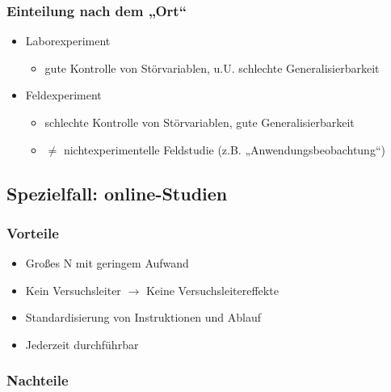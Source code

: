 \documentclass[
]{book}
\providecommand{\tightlist}{%
  \setlength{\itemsep}{0pt}\setlength{\parskip}{0pt}}
\begin{document}
\hypertarget{einteilung-nach-dem-ort}{%
\subsubsection{Einteilung nach dem „Ort``}\label{einteilung-nach-dem-ort}}

\begin{itemize}
\tightlist
\item
  Laborexperiment

  \begin{itemize}
  \tightlist
  \item
    gute Kontrolle von Störvariablen, u.U. schlechte Generalisierbarkeit
  \end{itemize}
\item
  Feldexperiment

  \begin{itemize}
  \tightlist
  \item
    schlechte Kontrolle von Störvariablen, gute Generalisierbarkeit
  \item
    \(\neq\) nichtexperimentelle Feldstudie (z.B. „Anwendungsbeobachtung``)
  \end{itemize}
\end{itemize}

\hypertarget{spezielfall-online-studien}{%
\subsection{Spezielfall: online-Studien}\label{spezielfall-online-studien}}

\hypertarget{vorteile}{%
\subsubsection{Vorteile}\label{vorteile}}

\begin{itemize}
\item
  Großes N mit geringem Aufwand
\item
  Kein Versuchsleiter \(\rightarrow\) Keine Versuchsleitereffekte
\item
  Standardisierung von Instruktionen und Ablauf
\item
  Jederzeit durchführbar
\end{itemize}

\hypertarget{nachteile}{%
\subsubsection{Nachteile}\label{nachteile}}
\end{document}
